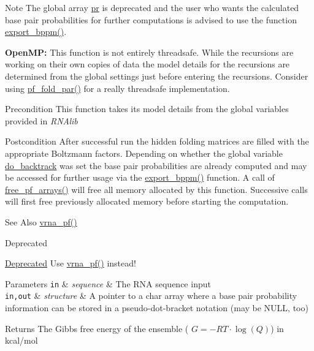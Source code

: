 \begin{DoxyNote}{Note}
The global array \hyperlink{fold__vars_8h_ac98ec419070aee6831b44e5c700f090f}{pr} is deprecated and the user who wants the calculated base pair probabilities for further computations is advised to use the function \hyperlink{group__pf__fold_gac5ac7ee281aae1c5cc5898a841178073}{export\-\_\-bppm()}. 

{\bfseries Open\-M\-P\-:} This function is not entirely threadsafe. While the recursions are working on their own copies of data the model details for the recursions are determined from the global settings just before entering the recursions. Consider using \hyperlink{group__pf__fold_gac4f95bee734b2563a3d6e9932117ebdf}{pf\-\_\-fold\-\_\-par()} for a really threadsafe implementation. 
\end{DoxyNote}
\begin{DoxyPrecond}{Precondition}
This function takes its model details from the global variables provided in {\itshape R\-N\-Alib} 
\end{DoxyPrecond}
\begin{DoxyPostcond}{Postcondition}
After successful run the hidden folding matrices are filled with the appropriate Boltzmann factors. Depending on whether the global variable \hyperlink{group__model__details_gad512b5dd4dbec60faccfe137bb474489}{do\-\_\-backtrack} was set the base pair probabilities are already computed and may be accessed for further usage via the \hyperlink{group__pf__fold_gac5ac7ee281aae1c5cc5898a841178073}{export\-\_\-bppm()} function. A call of \hyperlink{group__pf__fold_gae73db3f49a94f0f72e067ecd12681dbd}{free\-\_\-pf\-\_\-arrays()} will free all memory allocated by this function. Successive calls will first free previously allocated memory before starting the computation. 
\end{DoxyPostcond}
\begin{DoxySeeAlso}{See Also}
\hyperlink{group__pf__fold_ga29e256d688ad221b78d37f427e0e99bc}{vrna\-\_\-pf()} 
\end{DoxySeeAlso}
\begin{DoxyRefDesc}{Deprecated}
\item[\hyperlink{deprecated__deprecated000095}{Deprecated}]Use \hyperlink{group__pf__fold_ga29e256d688ad221b78d37f427e0e99bc}{vrna\-\_\-pf()} instead! 
\begin{DoxyParams}[1]{Parameters}
\mbox{\tt in}  & {\em sequence} & The R\-N\-A sequence input \\
\hline
\mbox{\tt in,out}  & {\em structure} & A pointer to a char array where a base pair probability information can be stored in a pseudo-\/dot-\/bracket notation (may be N\-U\-L\-L, too) \\
\hline
\end{DoxyParams}
\begin{DoxyReturn}{Returns}
The Gibbs free energy of the ensemble ( $G = -RT \cdot \log(Q) $) in kcal/mol 
\end{DoxyReturn}
\end{DoxyRefDesc}
